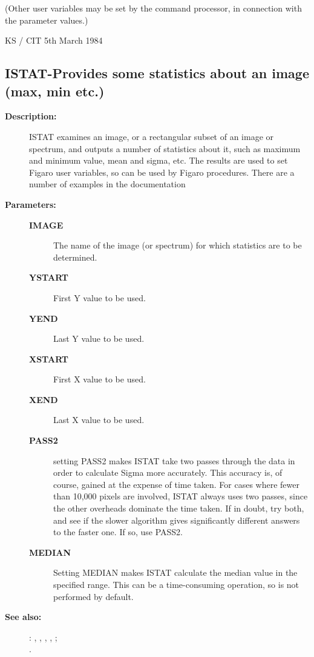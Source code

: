 \begin{description}
\begin{description}
\begin{terminalv}
 (Other user variables may be set by the command processor, in
 connection with the parameter values.)

                                     KS / CIT  5th March 1984
\end{terminalv}
\end{description}
\subsection{ISTAT-\label{ISTAT}Provides some statistics about an image (max, min etc.)}
\begin{description}

\item [\textbf{Description:}]
 ISTAT examines an image, or a rectangular subset of an image or
 spectrum, and outputs a number of statistics about it, such as
 maximum and minimum value, mean and sigma, etc.  The results
 are used to set Figaro user variables, so can be used by Figaro
 procedures.  There are a number of examples in the documentation

\item [\textbf{Parameters:}]
\begin{description}
\item [\textbf{IMAGE}]
 The name of the image (or spectrum) for
 which statistics are to be determined.
\item [\textbf{YSTART}]
 First Y value to be used.
\item [\textbf{YEND}]
 Last Y value to be used.
\item [\textbf{XSTART}]
 First X value to be used.
\item [\textbf{XEND}]
 Last X value to be used.
\item [\textbf{PASS2}]
 setting PASS2 makes ISTAT take two passes through the
 data in order to calculate Sigma more accurately.  This
 accuracy is, of course, gained at the expense of time
 taken.  For cases where fewer than 10,000 pixels are
 involved, ISTAT always uses two passes, since the other
 overheads dominate the time taken.  If in doubt, try
 both, and see if the slower algorithm gives significantly
 different answers to the faster one.  If so, use PASS2.
\item [\textbf{MEDIAN}]
 Setting MEDIAN makes ISTAT calculate the median value
 in the specified range.  This can be a time-consuming
 operation, so is not performed by default.
\end{description}

\item [\textbf{See also:}]
: , , , , ;\\
.\\


\end{description}
\end{description}
